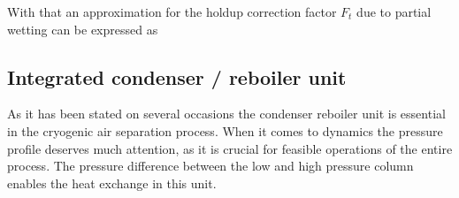         With that an approximation for the holdup correction factor $F_t$ due to partial wetting can be expressed as

\subsection{Integrated condenser / reboiler unit}

    As it has been stated on several occasions the condenser reboiler unit is essential in the cryogenic air separation process.
    When it comes to dynamics the pressure profile deserves much attention, as it is crucial for feasible operations of
    the entire process. The pressure difference between the low and high pressure column enables the heat exchange
    in this unit.
    \Eq{}{
    
    }


